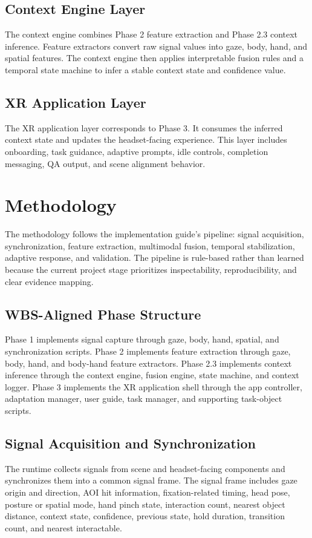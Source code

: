 \documentclass[conference]{IEEEtran}
\begin{document}
\subsection{Context Engine Layer}
The context engine combines Phase 2 feature extraction and Phase 2.3 context inference. Feature extractors convert raw signal values into gaze, body, hand, and spatial features. The context engine then applies interpretable fusion rules and a temporal state machine to infer a stable context state and confidence value.

\subsection{XR Application Layer}
The XR application layer corresponds to Phase 3. It consumes the inferred context state and updates the headset-facing experience. This layer includes onboarding, task guidance, adaptive prompts, idle controls, completion messaging, QA output, and scene alignment behavior.

\section{Methodology}
The methodology follows the implementation guide's pipeline: signal acquisition, synchronization, feature extraction, multimodal fusion, temporal stabilization, adaptive response, and validation. The pipeline is rule-based rather than learned because the current project stage prioritizes inspectability, reproducibility, and clear evidence mapping.

\subsection{WBS-Aligned Phase Structure}
Phase 1 implements signal capture through gaze, body, hand, spatial, and synchronization scripts. Phase 2 implements feature extraction through gaze, body, hand, and body-hand feature extractors. Phase 2.3 implements context inference through the context engine, fusion engine, state machine, and context logger. Phase 3 implements the XR application shell through the app controller, adaptation manager, user guide, task manager, and supporting task-object scripts.

\subsection{Signal Acquisition and Synchronization}
The runtime collects signals from scene and headset-facing components and synchronizes them into a common signal frame. The signal frame includes gaze origin and direction, AOI hit information, fixation-related timing, head pose, posture or spatial mode, hand pinch state, interaction count, nearest object distance, context state, confidence, previous state, hold duration, transition count, and nearest interactable.
\end{document}
